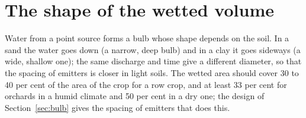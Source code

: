 \section{The shape of the wetted volume}
Water from a point source forms a bulb whose shape depends on the soil. In a sand the water goes down (a narrow, deep bulb) and in a clay it goes sideways (a wide, shallow one); the same discharge and time give a different diameter, so that the spacing of emitters is closer in light soils. The wetted area should cover 30 to 40 per cent of the area of the crop for a row crop, and at least 33 per cent for orchards in a humid climate and 50 per cent in a dry one; the design of Section~\ref{sec:bulb} gives the spacing of emitters that does this.
